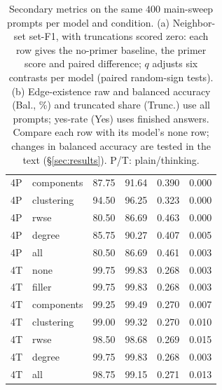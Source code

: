 \begin{table}[t]
\begin{minipage}[t]{.48\textwidth}
\begin{tabular}{llrrrr}
4P & components & 87.75 & 91.64 & 0.390 & 0.000\\ %
4P & clustering & 94.50 & 96.25 & 0.323 & 0.000\\ %
4P & rwse & 80.50 & 86.69 & 0.463 & 0.000\\ %
4P & degree & 85.75 & 90.27 & 0.407 & 0.005\\ %
4P & all & 80.50 & 86.69 & 0.461 & 0.003\\ %
\addlinespace[2pt]
4T & none & 99.75 & 99.83 & 0.268 & 0.003\\ %
4T & filler & 99.75 & 99.83 & 0.268 & 0.003\\ %
4T & components & 99.25 & 99.49 & 0.270 & 0.007\\ %
4T & clustering & 99.00 & 99.32 & 0.270 & 0.010\\ %
4T & rwse & 98.50 & 98.68 & 0.269 & 0.015\\ %
4T & degree & 99.75 & 99.83 & 0.268 & 0.003\\ %
4T & all & 98.75 & 99.15 & 0.271 & 0.013\\ %
\bottomrule
\end{tabular}
\end{minipage}
\caption{Secondary metrics on the same $400$ main-sweep prompts per model and condition. (a) Neighbor-set set-F1, with truncations scored zero: each row gives the no-primer baseline, the primer score and paired difference; $q$ adjusts six contrasts per model (paired random-sign tests). (b) Edge-existence raw and balanced accuracy (Bal., \%) and truncated share (Trunc.) use all prompts; yes-rate (Yes) uses finished answers. Compare each row with its model's none row; changes in balanced accuracy are tested in the text (\S\ref{sec:results}). P/T: plain/thinking.} %
\label{tab:primarymetrics}
\end{table}
